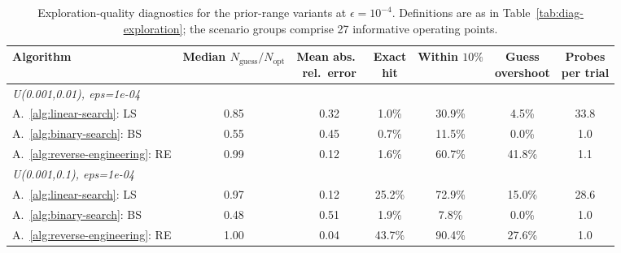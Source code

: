 \begin{table}[ht]
\centering
\small
\caption{Exploration-quality diagnostics for the prior-range variants at $\epsilon=10^{-4}$. Definitions are as in Table~\ref{tab:diag-exploration}; the scenario groups comprise 27 informative operating points.}
\label{tab:diag-exploration-priors}
\begin{tabular}{lcccccc}
\toprule
Algorithm
& \makecell{Median \\ $N_{\mathrm{guess}}/N_{\mathrm{opt}}$}
& \makecell{Mean abs.\ \\ rel.\ error}
& \makecell{Exact \\ hit}
& \makecell{Within \\ $10\%$}
& \makecell{Guess \\ overshoot}
& \makecell{Probes \\ per trial} \\
\midrule
\multicolumn{7}{l}{\itshape U(0.001,0.01), eps=1e-04} \\
A.~\ref{alg:linear-search}: LS
& 0.85
& 0.32
& 1.0\%
& 30.9\%
& 4.5\%
& 33.8 \\
A.~\ref{alg:binary-search}: BS
& 0.55
& 0.45
& 0.7\%
& 11.5\%
& 0.0\%
& 1.0 \\
A.~\ref{alg:reverse-engineering}: RE
& 0.99
& 0.12
& 1.6\%
& 60.7\%
& 41.8\%
& 1.1 \\
\midrule
\multicolumn{7}{l}{\itshape U(0.001,0.1), eps=1e-04} \\
A.~\ref{alg:linear-search}: LS
& 0.97
& 0.12
& 25.2\%
& 72.9\%
& 15.0\%
& 28.6 \\
A.~\ref{alg:binary-search}: BS
& 0.48
& 0.51
& 1.9\%
& 7.8\%
& 0.0\%
& 1.0 \\
A.~\ref{alg:reverse-engineering}: RE
& 1.00
& 0.04
& 43.7\%
& 90.4\%
& 27.6\%
& 1.0 \\
\bottomrule
\end{tabular}
\end{table}

